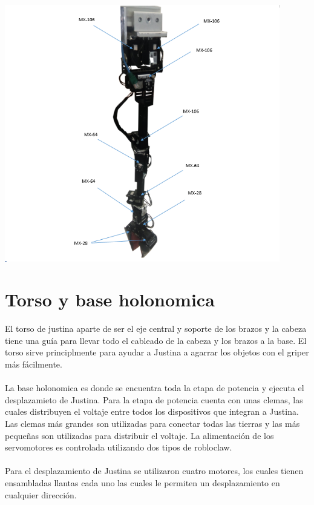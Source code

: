 \documentclass[user_manual.tex]{subfiles}
\begin{document}
\begin{center}
\includegraphics[width=0.9\textwidth]{Figures/Hardware/Diagramas/Brazo.png}
\label{fig:Hardware:Diagramas:Justina:Brazo}
\end{center}
\section{Torso y base holonomica}
El torso de justina aparte de ser el eje central y soporte de los brazos y la cabeza tiene una guía para llevar todo el
cableado de la cabeza y los brazos a la base. El torso sirve principlmente para ayudar a Justina a agarrar los objetos con el griper más fácilmente. \\
\\
La base holonomica es donde se encuentra toda la etapa de potencia y ejecuta el desplazamieto de Justina. Para la etapa de potencia cuenta con unas clemas, las cuales distribuyen el voltaje entre todos los dispositivos que integran a Justina. Las clemas más grandes son utilizadas para conectar todas las tierras y las más pequeñas son utilizadas para distribuir el voltaje. La alimentación de los servomotores es controlada utilizando dos tipos
de robloclaw.\\
\\ Para el desplazamiento de Justina se utilizaron cuatro motores, los cuales tienen ensambladas llantas cada uno las cuales le permiten un desplazamiento en cualquier dirección.
\end{document}
